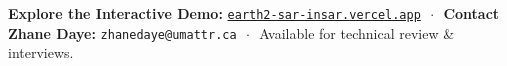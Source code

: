 \documentclass[10pt,letterpaper]{article}
\begin{document}
\vspace{-2pt}

\begin{tcolorbox}[colframe=nvidiadark,colback=nvidiadark,coltext=white,boxrule=0pt,top=4pt,bottom=4pt]
\centering\footnotesize
\textbf{Explore the Interactive Demo:} \href{https://earth2-sar-insar.vercel.app}{\texttt{earth2-sar-insar.vercel.app}} $\,\cdot\,$ 
\textbf{Contact Zhane Daye:} \texttt{zhanedaye@umattr.ca} $\,\cdot\,$ Available for technical review \& interviews.
\end{tcolorbox}
\end{document}
